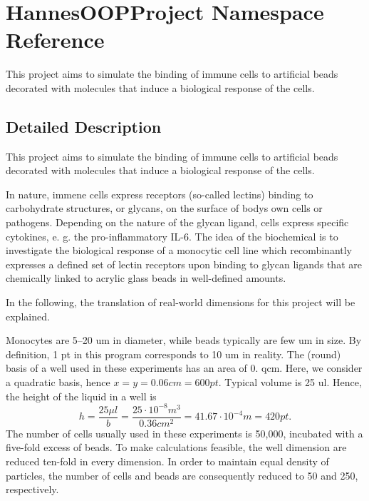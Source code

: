 \hypertarget{namespace_hannes_o_o_p_project}{}\section{Hannes\+O\+O\+P\+Project Namespace Reference}
\label{namespace_hannes_o_o_p_project}


This project aims to simulate the binding of immune cells to artificial beads decorated with molecules that induce a biological response of the cells.  




\subsection{Detailed Description}
This project aims to simulate the binding of immune cells to artificial beads decorated with molecules that induce a biological response of the cells. 

In nature, immene cells express receptors (so-\/called lectins) binding to carbohydrate structures, or glycans, on the surface of body\textquotesingle{}s own cells or pathogens. Depending on the nature of the glycan ligand, cells express specific cytokines, e. g. the pro-\/inflammatory I\+L-\/6. The idea of the biochemical is to investigate the biological response of a monocytic cell line which recombinantly expresses a defined set of lectin receptors upon binding to glycan ligands that are chemically linked to acrylic glass beads in well-\/defined amounts.

In the following, the translation of real-\/world dimensions for this project will be explained.

Monocytes are 5--20 um in diameter, while beads typically are few um in size. By definition, 1 pt in this program corresponds to 10 um in reality. The (round) basis of a well used in these experiments has an area of 0. qcm. Here, we consider a quadratic basis, hence $x=y=0.06 cm=600 pt$. Typical volume is 25 ul. Hence, the height of the liquid in a well is \[ h = \frac{25 \mu l}{b} = \frac{25 \cdot 10^{-8} m^3}{0.36 cm^2} = 41.67 \cdot 10^{-4} m = 420 pt. \] The number of cells usually used in these experiments is 50,000, incubated with a five-\/fold excess of beads. To make calculations feasible, the well dimension are reduced ten-\/fold in every dimension. In order to maintain equal density of particles, the number of cells and beads are consequently reduced to 50 and 250, respectively.

